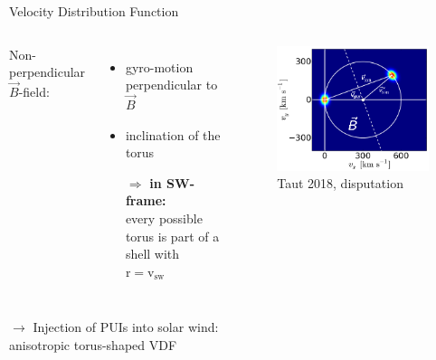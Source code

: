 \documentclass{beamer}
\begin{document}
\begin{frame}{Velocity Distribution Function}
	\begin{minipage}{1\textwidth}
	\begin{columns}
	\column{5cm}
		Non-perpendicular $\vec{B}$-field:
		\begin{itemize}
			\item gyro-motion perpendicular to $\vec{B}$
			\item inclination of the torus
			\item[\large{$\Rightarrow$}] \textbf{in SW-frame:} \\ every possible torus is part of a shell with $\mathrm{r} =\mathrm{v_{sw}}$
		\end{itemize}
	\column{5.5cm}
		\begin{figure}
			\includegraphics[scale=0.35]{pictures/2d_b_schief.png}
			\caption{\tiny{Taut 2018, disputation}}
		\end{figure}
	\end{columns}
	\end{minipage}
	\vspace{4cm}
	\begin{minipage}{1\textwidth}
		\vspace{.1cm}
		\begin{center}
		$\longrightarrow$ Injection of PUIs into solar wind: \\ anisotropic torus-shaped VDF
		\end{center}
	\end{minipage}
\end{frame}
\end{document}
